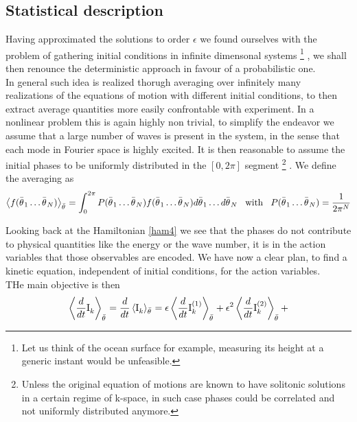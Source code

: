 \subsection{Statistical description}
Having approximated the solutions to order $\epsilon$ we found ourselves with the problem of gathering 
initial conditions in infinite dimensonal systems
\footnote{Let us think of the ocean surface for example, measuring its height at a generic instant would be unfeasible.}
, we shall then renounce the deterministic approach in favour of 
a probabilistic one.\\
In general such idea is realized thorugh averaging over infinitely many realizations of the equations of motion with different initial conditions, to then extract 
average quantities more easily confrontable with experiment. In a nonlinear problem this is again highly non trivial, to simplify the endeavor we assume that
a large number of waves is present in the system, in the sense that each mode in Fourier space is highly excited. It is then reasonable to assume 
the initial phases to be uniformly distributed in the $\left[0,2\pi\right]$ segment 
\footnote{Unless the original equation of motions are known to have solitonic solutions in a certain regime of k-space, in such case phases could be correlated and not 
uniformly distributed anymore.}
. We define the averaging as
\begin{equation}
    \left\langle f(\bar{\theta^{}}_1 \dots \bar{\theta^{}}_N) \right\rangle_{\bar{\theta}^{}} = 
    \int_{0}^{2\pi} P(\bar{\theta^{}}_1 \dots \bar{\theta^{}}_N)f(\bar{\theta^{}}_1 \dots \bar{\theta^{}}_N) d\bar{\theta^{}}_1 \dots d\bar{\theta^{}}_N 
    \hspace{3mm} \text{with} \hspace{3mm}
    P(\bar{\theta^{}}_1 \dots \bar{\theta^{}}_N) = \frac{1}{2\pi^{N}}
\end{equation}

Looking back at the Hamiltonian \eqref{ham4} we see that the phases do not contribute to physical quantities like the energy or the wave number, 
it is in the action variables that those observables are encoded. We have now a clear plan, to find a kinetic equation, independent of initial conditions, for
the action variables. \\
THe main objective is then
\begin{equation}
    \left\langle \frac{d}{dt} \mathrm{I}^{}_k \right\rangle_{\bar{\theta}^{}} = \frac{d}{dt} \left\langle \mathrm{I}^{}_k \right\rangle_{\bar{\theta}^{}} = 
    \epsilon\left\langle \frac{d}{dt} \mathrm{I}^{(1)}_k \right\rangle_{\bar{\theta}^{}} + \epsilon^2\left\langle \frac{d}{dt} \mathrm{I}^{(2)}_k \right\rangle_{\bar{\theta}^{}} + 
\end{equation}



